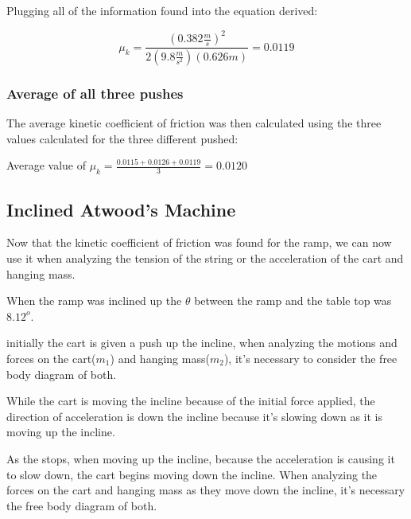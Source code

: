 \documentclass[aps,letterpaper,11pt]{revtex4}
\begin{document}
Plugging all of the information found into the equation derived:

$$ \mu_k=\frac{(0.382\frac{m}{s})^2}{2(9.8\frac{m}{s^2})(0.626m)} = 0.0119$$

\subsubsection{Average of all three pushes}

The average kinetic coefficient of friction was then calculated using the three values calculated for the three different pushed:

\begin{center}
Average value of $\mu_k = \frac{0.0115 + 0.0126 + 0.0119}{3} = \boxed{0.0120}$
\end{center}

\subsection{Inclined Atwood's Machine}

Now that the kinetic coefficient of friction was found for the ramp, we can now use it when analyzing the tension of the string or the acceleration of the cart and hanging mass. 

When the ramp was inclined up the $\theta$ between the ramp and the table top was $8.12^o$.

initially the cart is given a push up the incline, when analyzing the motions and forces on the cart($m_1$) and hanging mass($m_2$), it's necessary to consider the free body diagram of both.

\begin{center}

\end{center}

While the cart is moving the incline because of the initial force applied, the direction of acceleration is down the incline because it's slowing down as it is moving up the incline.

As the stops, when moving up the incline, because the acceleration is causing it to slow down, the cart begins moving down the incline. When analyzing the forces on the cart and hanging mass as they move down the incline, it's necessary the free body diagram of both.

\begin{center}

\end{center}
\end{document}
